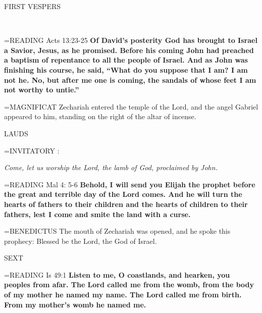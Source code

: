 \begin{flushleft}\normalsize \begin{flushleft}\normalsize FIRST VESPERS\\\end{flushleft}\\\end{flushleft}

\hangindent=\parindent \small{READING} Acts 13:23-25 \textbf{Of David’s posterity God has brought to Israel a
Savior, Jesus, as he promised. Before his coming John had preached
a baptism of repentance to all the people of Israel. And as John was
finishing his course, he said, “What do you suppose that I am? I am
not he. No, but after me one is coming, the sandals of whose feet I
am not worthy to untie.”\\}
 
\hangindent=\parindent \small{MAGNIFICAT  Zechariah entered the temple of the Lord, and the
angel Gabriel appeared to him, standing on the right of the altar of
incense.\\}
 
\begin{flushleft}\normalsize LAUDS\\\end{flushleft}

\hangindent=\parindent \small{INVITATORY :}
\begin{center}
\textit{Come, let us worship the Lord, the lamb of God, proclaimed by John.\\}
\end{center}

\hangindent=\parindent \small{READING} Mal 4: 5-6 \textbf{Behold, I will send you Elijah the prophet before
the great and terrible day of the Lord comes. And he will turn the
hearts of fathers to their children and the hearts of children to their
fathers, lest I come and smite the land with a curse.\\}
 
\hangindent=\parindent \small{BENEDICTUS  The mouth of Zechariah was opened, and he spoke this
prophecy: Blessed be the Lord, the God of Israel.\\}
 
\begin{flushleft}\normalsize SEXT\\\end{flushleft}

\hangindent=\parindent \small{READING} Is 49:1 \textbf{Listen to me, O coastlands, and hearken, you peoples
from afar. The Lord called me from the womb, from the body of
my mother he named my name.
The Lord called me from birth.
From my mother’s womb he named me.}
 

